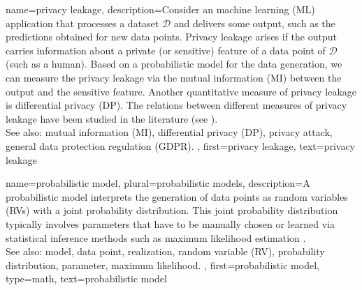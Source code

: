 {
{name={privacy leakage},
	description={Consider an machine learning (ML) application that processes a 
		dataset $\mathcal{D}$ and delivers some output, such as the predictions 
		obtained for new data points. Privacy leakage arises 
		if the output carries information about a private (or sensitive) feature of 
		a data point of $\mathcal{D}$ (such as a human). Based on a probabilistic model 
		for the data generation, we can measure the privacy leakage via the mutual information (MI) 
		between the output and the sensitive feature. Another quantitative measure of privacy leakage 
		is differential privacy (DP). The relations between different measures of privacy leakage have been 
		studied in the literature (see \cite{InfThDiffPriv}). 
				\\ 
		See also: mutual information (MI), differential privacy (DP), privacy attack, general data protection regulation (GDPR). }, 
	first={privacy leakage}, 
	text={privacy leakage} 
}


{name={probabilistic model}, plural={probabilistic models},
	description={A probabilistic model interprets the 
	             generation of data points as random variables (RVs) with a joint probability distribution. 
				This joint probability distribution typically involves parameters that have to 
				be manually chosen or learned via statistical inference methods such as 
				maximum likelihood estimation \cite{LC}.
					\\ 
		See also: model, data point, realization, random variable (RV), probability distribution, parameter, maximum likelihood. }, 
	first={probabilistic model}, 
	type=math,
	text={probabilistic model} 
}


}
